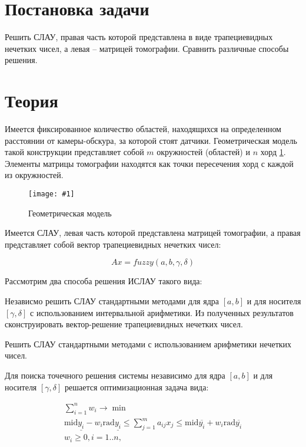 \documentclass[a4paper,12pt]{article}
\newcommand{\plot}[3]{
    \begin{figure}[H]
        \begin{center}
            \texttt{[image: \#1]}
            \caption{#2}
            \label{#3}
        \end{center}
    \end{figure}
}
\begin{document}
    
    \newpage

    \tableofcontents
    \listoffigures
    \newpage

    \section{Постановка задачи}
    \quad Решить СЛАУ, правая часть которой представлена в виде трапециевидных нечетких чисел, а левая -- матрицей томографии. Сравнить различные способы решения.
    
    \section{Теория}
    \quad Имеется фиксированное количество областей, находящихся на определенном расстоянии от камеры-обскура, за которой стоят датчики. Геометрическая модель такой конструкции представляет собой $ m $ окружностей (областей) и $ n $ хорд \ref{p:model}. Элементы матрицы томографии находятся как точки пересечения хорд с каждой из окружностей.

    \plot{img/tom.png}{Геометрическая модель}{p:model}

    \quad Имеется СЛАУ, левая часть которой представлена матрицей томографии, а правая представляет собой вектор трапециевидных нечетких чисел:

    \begin{equation}
        Ax = fuzzy(a, b, \gamma, \delta)
        \label{e:slau}
    \end{equation}

    Рассмотрим два способа решения ИСЛАУ такого вида:

    Независмо решить СЛАУ стандартными методами для ядра $ [a, b] $ и для носителя $ [\gamma, \delta] $ с использованием интервальной арифметики. Из полученных результатов сконструировать вектор-решение трапециевидных нечетких чисел.

    Решить СЛАУ стандартными методами с использованием арифметики нечетких чисел.

    Для поиска точечного решения системы независимо для ядра $ [a, b] $ и для носителя $ [\gamma, \delta] $ решается оптимизационная задача вида:

    \begin{equation}
        \begin{gathered}
            \sum_{i = 1}^{n}w_{i} \to \min \\
            \text{mid}\underline{y_i} - w_{i} \text{rad}\underline{y_i} \leq \sum_{j = 1}^{m}{a_{ij}x_j} \leq \text{mid}\overline{y_i} + w_{i} \text{rad}\overline{y_i} \\
            w_{i} \geq 0, i = 1..n, \\
        \end{gathered}
        \label{e:point}
    \end{equation}
\end{document}
